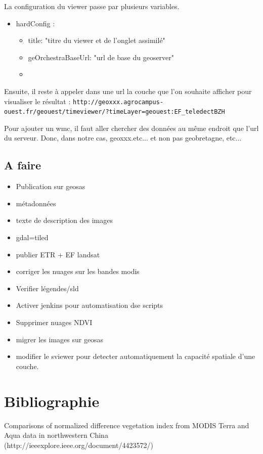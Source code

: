 \documentclass[10pt,a4paper]{article}
\begin{document}
La configuration du viewer passe par plusieurs variables.
\begin{itemize}
\item hardConfig :
\begin{itemize}
\item title: "titre du viewer et de l'onglet assimilé"
\item geOrchestraBaseUrl: "url de base du geoserver"
\item 
\end{itemize}
\end{itemize}

Ensuite, il reste à appeler dans une url la couche que l'on souhaite afficher pour visualiser le résultat : \verb!http://geoxxx.agrocampus-ouest.fr/geouest/timeviewer/?timeLayer=geouest:EF_teledectBZH!

Pour ajouter un wmc, il faut aller chercher des données au même endroit que l'url du serveur. Donc, dans notre cas, geoxxx.etc... et non pas geobretagne, etc...
\subsection{A faire}
\begin{itemize}
\item Publication sur geosas
\item métadonnées
\item texte de description des images
\item gdal=tiled
\item publier ETR + EF landsat
\item corriger les nuages sur les bandes modis
\item Verifier légendes/sld
\item Activer jenkins pour automatisation dse scripts
\item Supprimer nuages NDVI
\item migrer les images sur geosas
\item modifier le sviewer pour detecter automatiquement la capacité spatiale d'une couche.
\end{itemize}
\section{Bibliographie}

Comparisons of normalized difference vegetation index from MODIS Terra and Aqua data in northwestern China (http://ieeexplore.ieee.org/document/4423572/)
\end{document}
